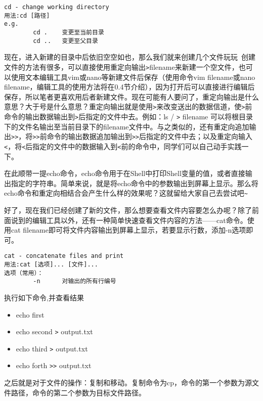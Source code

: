 \begin{verbatim}
cd - change working directory
用法:cd [路径]
e.g.
		cd .	变更至当前目录
		cd ..	变更至父目录
\end{verbatim}

现在，进入新建的目录中后依旧空空如也，那么我们就来创建几个文件玩玩~创建文件的方法有很多，可以直接使用重定向输出\verb|>|filename来新建一个空文件，也可以使用文本编辑工具vim或nano等新建文件后保存（使用命令vim filename或nano filename，编辑工具的使用方法将在0.4节介绍），因为打开后可以直接进行编辑后保存，所以笔者更喜欢用后者新建文件。现在可能有人要问了，重定向输出是什么意思？大于号是什么意思？重定向输出就是使用\verb|>|来改变送出的数据信道，使\verb|>|前命令的输出数据输出到\verb|>|后指定的文件中去。例如：ls / \verb|>| filename 可以将根目录下的文件名输出至当前目录下的filename文件中。与之类似的，还有重定向追加输出\verb|>>|，将\verb|>>|前命令的输出数据追加输出到\verb|>>|后指定的文件中去；以及重定向输入\verb|<|，将\verb|<|后指定的文件中的数据输入到\verb|<|前的命令中，同学们可以自己动手实践一下。

在此顺带一提echo命令，echo命令用于在Shell中打印Shell变量的值，或者直接输出指定的字符串。简单来说，就是将echo命令中的参数输出到屏幕上显示。那么将echo命令和重定向相结合会产生什么样的效果呢？这就留给大家自己去尝试吧\verb|~|

好了，现在我们已经创建了新的文件，那么想要查看文件内容要怎么办呢？除了前面说到的编辑工具以外，还有一种简单快速查看文件内容的方法——cat命令。使用cat filename即可将文件内容输出到屏幕上显示，若要显示行数，添加-n选项即可。

\begin{verbatim}
cat - concatenate files and print
用法:cat [选项]... [文件]...
选项（常用）：
		-n		对输出的所有行编号
\end{verbatim}

\begin{exercise}
	执行如下命令,并查看结果
	\begin{itemize}
		\item echo first
		\item echo second \verb|>| output.txt
		\item echo third \verb|>| output.txt
		\item echo forth \verb|>>| output.txt
	\end{itemize}
\end{exercise}

之后就是对于文件的操作：复制和移动。复制命令为cp，命令的第一个参数为源文件路径，命令的第二个参数为目标文件路径。

